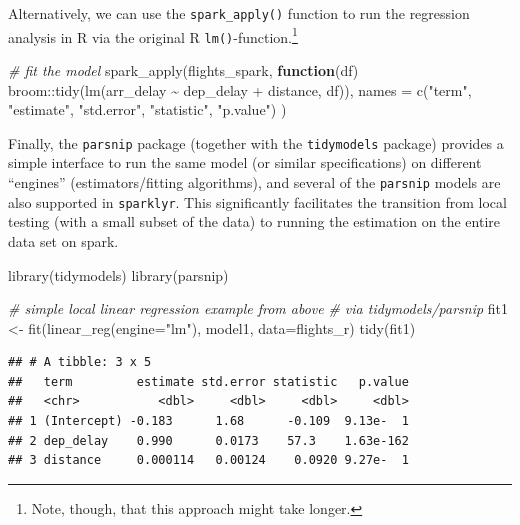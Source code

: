 \documentclass[
  12pt,
]{style/krantz}
\newenvironment{Shaded}{\begin{snugshade}}{\end{snugshade}}
\newcommand{\AttributeTok}[1]{\textcolor[rgb]{0.77,0.63,0.00}{#1}}
\newcommand{\CommentTok}[1]{\textcolor[rgb]{0.56,0.35,0.01}{\textit{#1}}}
\newcommand{\ControlFlowTok}[1]{\textcolor[rgb]{0.13,0.29,0.53}{\textbf{#1}}}
\newcommand{\FunctionTok}[1]{\textcolor[rgb]{0.00,0.00,0.00}{#1}}
\newcommand{\NormalTok}[1]{#1}
\newcommand{\OtherTok}[1]{\textcolor[rgb]{0.56,0.35,0.01}{#1}}
\newcommand{\SpecialCharTok}[1]{\textcolor[rgb]{0.00,0.00,0.00}{#1}}
\newcommand{\StringTok}[1]{\textcolor[rgb]{0.31,0.60,0.02}{#1}}
\begin{document}
Alternatively, we can use the \texttt{spark\_apply()} function to run the regression analysis in R via the original R \texttt{lm()}-function.\footnote{Note, though, that this approach might take longer.}

\begin{Shaded}
\begin{Highlighting}[]
\CommentTok{\# fit the model}
\FunctionTok{spark\_apply}\NormalTok{(flights\_spark, }\ControlFlowTok{function}\NormalTok{(df) broom}\SpecialCharTok{::}\FunctionTok{tidy}\NormalTok{(}\FunctionTok{lm}\NormalTok{(arr\_delay }\SpecialCharTok{\textasciitilde{}}\NormalTok{ dep\_delay }\SpecialCharTok{+}\NormalTok{ distance, df)),}
        \AttributeTok{names =} \FunctionTok{c}\NormalTok{(}\StringTok{"term"}\NormalTok{, }\StringTok{"estimate"}\NormalTok{, }\StringTok{"std.error"}\NormalTok{, }\StringTok{"statistic"}\NormalTok{, }\StringTok{"p.value"}\NormalTok{)}
\NormalTok{    )}
\end{Highlighting}
\end{Shaded}

Finally, the \texttt{parsnip} package (together with the \texttt{tidymodels} package) provides a simple interface to run the same model (or similar specifications) on different ``engines'' (estimators/fitting algorithms), and several of the \texttt{parsnip} models are also supported in \texttt{sparklyr}. This significantly facilitates the transition from local testing (with a small subset of the data) to running the estimation on the entire data set on spark.

\begin{Shaded}
\begin{Highlighting}[]
\FunctionTok{library}\NormalTok{(tidymodels)}
\FunctionTok{library}\NormalTok{(parsnip)}

\CommentTok{\# simple local linear regression example from above}
\CommentTok{\# via tidymodels/parsnip}
\NormalTok{fit1 }\OtherTok{\textless{}{-}} \FunctionTok{fit}\NormalTok{(}\FunctionTok{linear\_reg}\NormalTok{(}\AttributeTok{engine=}\StringTok{"lm"}\NormalTok{), model1, }\AttributeTok{data=}\NormalTok{flights\_r)}
\FunctionTok{tidy}\NormalTok{(fit1)}
\end{Highlighting}
\end{Shaded}

\begin{verbatim}
## # A tibble: 3 x 5
##   term         estimate std.error statistic   p.value
##   <chr>           <dbl>     <dbl>     <dbl>     <dbl>
## 1 (Intercept) -0.183      1.68      -0.109  9.13e-  1
## 2 dep_delay    0.990      0.0173    57.3    1.63e-162
## 3 distance     0.000114   0.00124    0.0920 9.27e-  1
\end{verbatim}
\end{document}
